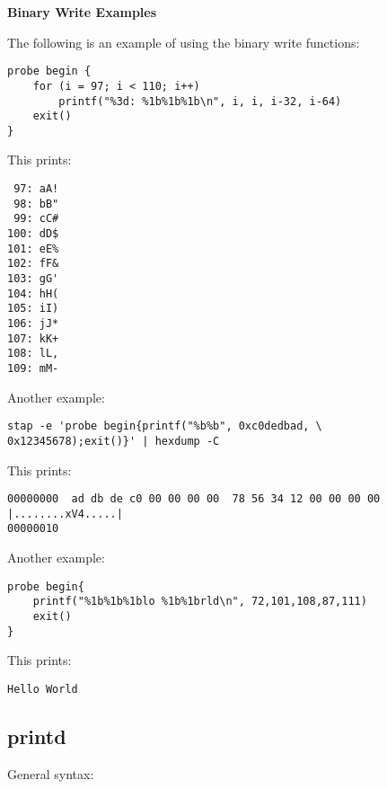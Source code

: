 \documentclass[twoside,english]{article}
\newenvironment{vindent}
{\begin{list}{}{\setlength{\listparindent}{6pt}}
\item[]}
{\end{list}}
\begin{document}
\textbf{Binary Write Examples}

The following is an example of using the binary write functions:

\begin{vindent}
\begin{verbatim}
probe begin {
    for (i = 97; i < 110; i++)
        printf("%3d: %1b%1b%1b\n", i, i, i-32, i-64)
    exit()
}
\end{verbatim}
\end{vindent}
This prints:

\begin{vindent}
\begin{verbatim}
 97: aA!
 98: bB"
 99: cC#
100: dD$
101: eE%
102: fF&
103: gG'
104: hH(
105: iI)
106: jJ*
107: kK+
108: lL,
109: mM-
\end{verbatim}
\end{vindent}
Another example:

\begin{vindent}
\begin{verbatim}
stap -e 'probe begin{printf("%b%b", 0xc0dedbad, \
0x12345678);exit()}' | hexdump -C

\end{verbatim}
\end{vindent}
This prints:

\begin{vindent}
\begin{verbatim}
00000000  ad db de c0 00 00 00 00  78 56 34 12 00 00 00 00  |........xV4.....|
00000010
\end{verbatim}
\end{vindent}
Another example:

\begin{vindent}
\begin{verbatim}
probe begin{
    printf("%1b%1b%1blo %1b%1brld\n", 72,101,108,87,111)
    exit()
}
\end{verbatim}
\end{vindent}
This prints:

\begin{vindent}
\begin{verbatim}
Hello World
\end{verbatim}
\end{vindent}

\subsection{printd}
General syntax:
\end{document}

